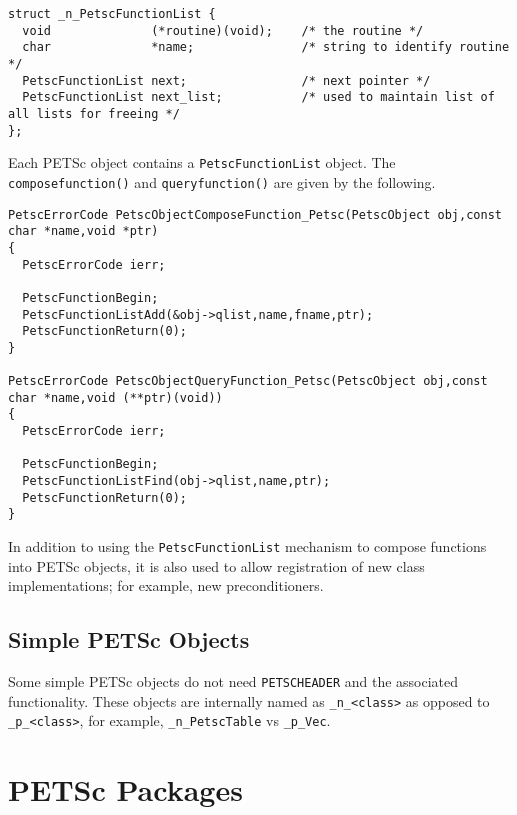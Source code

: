 \begin{lstlisting}
struct _n_PetscFunctionList {
  void              (*routine)(void);    /* the routine */
  char              *name;               /* string to identify routine */
  PetscFunctionList next;                /* next pointer */
  PetscFunctionList next_list;           /* used to maintain list of all lists for freeing */
};
\end{lstlisting}

Each PETSc object contains a \lstinline{PetscFunctionList} object.
The \lstinline{composefunction()} and \lstinline{queryfunction()} are given by the following.

\begin{lstlisting}
PetscErrorCode PetscObjectComposeFunction_Petsc(PetscObject obj,const char *name,void *ptr)
{
  PetscErrorCode ierr;

  PetscFunctionBegin;
  PetscFunctionListAdd(&obj->qlist,name,fname,ptr);
  PetscFunctionReturn(0);
}

PetscErrorCode PetscObjectQueryFunction_Petsc(PetscObject obj,const char *name,void (**ptr)(void))
{
  PetscErrorCode ierr;

  PetscFunctionBegin;
  PetscFunctionListFind(obj->qlist,name,ptr);
  PetscFunctionReturn(0);
}
\end{lstlisting}

In addition to using the \lstinline{PetscFunctionList} mechanism to compose functions into PETSc objects, it is also used to allow registration of new class implementations; for example, new preconditioners.

\subsection{Simple PETSc Objects}

Some simple PETSc objects do not need \lstinline{PETSCHEADER} and
the associated functionality. These objects are internally named as
\lstinline{_n_<class>} as opposed to \lstinline{_p_<class>}, for example, \lstinline{_n_PetscTable}
vs \lstinline{_p_Vec}.

\section{PETSc Packages}

